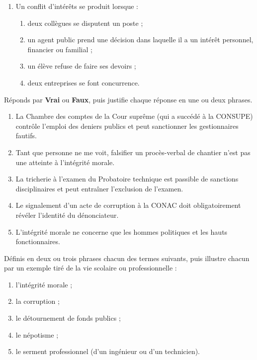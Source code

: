 \documentclass[11pt]{article}
\newcommand{\cle}[1]{{\popxbold\color{popdark}#1}}
\begin{document}
\begin{exercice}
\begin{enumerate}
\begin{enumerate}
\item de contrôler le budget de l'État en amont des dépenses ;
\item de recruter les fonctionnaires.
\end{enumerate}
\item Un \cle{conflit d'intérêts} se produit lorsque :
\begin{enumerate}
\item deux collègues se disputent un poste ;
\item un agent public prend une décision dans laquelle il a un intérêt personnel, financier ou familial ;
\item un élève refuse de faire ses devoirs ;
\item deux entreprises se font concurrence.
\end{enumerate}
\end{enumerate}
\end{exercice}

\begin{exercice}
Réponds par \textbf{Vrai} ou \textbf{Faux}, puis justifie chaque réponse en une ou deux phrases.
\begin{enumerate}
\item La Chambre des comptes de la Cour suprême (qui a succédé à la CONSUPE) contrôle l'emploi des deniers publics et peut sanctionner les gestionnaires fautifs.
\item Tant que personne ne me voit, falsifier un procès-verbal de chantier n'est pas une atteinte à l'intégrité morale.
\item La tricherie à l'examen du Probatoire technique est passible de sanctions disciplinaires et peut entraîner l'exclusion de l'examen.
\item Le signalement d'un acte de corruption à la CONAC doit obligatoirement révéler l'identité du dénonciateur.
\item L'intégrité morale ne concerne que les hommes politiques et les hauts fonctionnaires.
\end{enumerate}
\end{exercice}

\begin{exercice}
Définis en deux ou trois phrases chacun des termes suivants, puis illustre chacun par un exemple tiré de la vie scolaire ou professionnelle :
\begin{enumerate}
\item l'intégrité morale ;
\item la corruption ;
\item le détournement de fonds publics ;
\item le népotisme ;
\item le serment professionnel (d'un ingénieur ou d'un technicien).
\end{enumerate}
\end{exercice}
\end{document}

